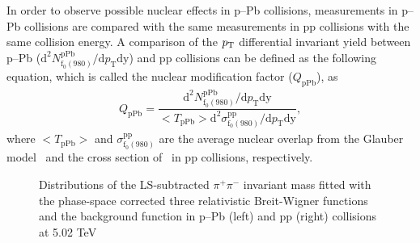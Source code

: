 \documentclass[ALICE,manyauthors]{cernphprep}
\begin{document}
In order to observe possible nuclear effects in p--Pb collisions, measurements in p--Pb collisions are compared with the same measurements in pp collisions with the same collision energy. A comparison of the $p_{\rm{T}}$ differential invariant yield between p--Pb ($\mathrm{d}^{2} N_{\mathrm{f}_{0}(980)}^{\mathrm{pPb}} / \mathrm{d} p_{\mathrm{T}} \mathrm{dy}$) and pp collisions can be defined as the following equation, which is called the nuclear modification factor ($Q_{\mathrm{pPb}}$), as
\begin{eqnarray}
Q_{\mathrm{pPb}} = \dfrac{\mathrm{d}^{2} N_{\mathrm{f}_{0}(980)}^{\mathrm{pPb}} / \mathrm{d} p_{\mathrm{T}} \mathrm{dy} }{ <T_{\mathrm{pPb}}> \mathrm{d}^{2} \sigma_{\mathrm{f}_{0}(980)}^{\mathrm{pp}}/ \mathrm{d} p_{\mathrm{T}} \mathrm{dy} },
\end{eqnarray}
where $<T_{\mathrm{pPb}}>$ and $\sigma_{\mathrm{f}_{0}(980)}^{\mathrm{pp}}$ are the average nuclear overlap from the Glauber model~\cite{Miller:2007ri} and the cross section of \fzero~in pp collisions, respectively. 

\begin{figure}[!hbt]
	\centering
	\caption{ Distributions of the LS-subtracted $\pi^{+}\pi^{-}$ invariant mass fitted with the phase-space corrected three relativistic Breit-Wigner functions and the background function in p--Pb (left) and pp (right) collisions at 5.02 TeV}
	\label{fig:SigExt}
\end{figure}
\end{document}
